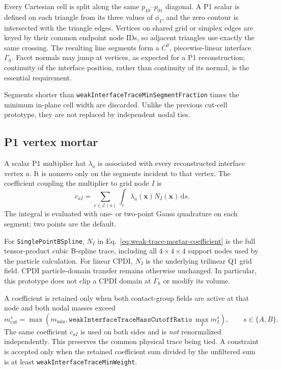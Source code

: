 Every Cartesian cell is split along the same $p_{10}$--$p_{01}$ diagonal.  A
P1 scalar is defined on each triangle from its three values of $\phi_I$, and
the zero contour is intersected with the triangle edges.  Vertices on shared
grid or simplex edges are keyed by their common endpoint node IDs, so adjacent
triangles use exactly the same crossing.  The resulting line segments form a
$C^0$, piecewise-linear interface $\Gamma_h$.  Facet normals may jump at
vertices, as expected for a P1 reconstruction; continuity of the interface
position, rather than continuity of its normal, is the essential requirement.

Segments shorter than
\texttt{weakInterfaceTraceMinSegmentFraction} times the minimum in-plane cell
width are discarded.  Unlike the previous cut-cell prototype, they are not
replaced by independent nodal ties.

\subsection{P1 vertex mortar}

A scalar P1 multiplier hat $\lambda_a$ is associated with every reconstructed
interface vertex $a$.  It is nonzero only on the segments incident to that
vertex.  The coefficient coupling the multiplier to grid node $I$ is
\begin{equation}
  c_{aI} =
  \sum_{e\in\mathcal{E}(a)}\int_e \lambda_a(\mathbf{x})N_I(\mathbf{x})\,\mathrm{d}s.
  \label{eq:weak-trace-mortar-coefficient}
\end{equation}
The integral is evaluated with one- or two-point Gauss quadrature on each
segment; two points are the default.

For \texttt{SinglePointBSpline}, $N_I$ in
Eq.~\eqref{eq:weak-trace-mortar-coefficient} is the full tensor-product cubic
B-spline trace, including all $4\times4\times4$ support nodes used by the
particle calculation.  For linear CPDI, $N_I$ is the underlying trilinear Q1
grid field.  CPDI particle-domain transfer remains otherwise unchanged.  In
particular, this prototype does not clip a CPDI domain at $\Gamma_h$ or modify
its volume.

A coefficient is retained only when both contact-group fields are active at
that node and both nodal masses exceed
\begin{equation}
  m_{\mathrm{cut}}^s =
  \max\!\left(m_{\min},
  \texttt{weakInterfaceTraceMassCutoffRatio}\,\max_I m_I^s\right),
  \qquad s\in\{A,B\}.
  \label{eq:weak-trace-mass-cutoff}
\end{equation}
The same coefficient $c_{aI}$ is used on both sides and is \emph{not}
renormalized independently.  This preserves the common physical trace being
tied.  A constraint is accepted only when the retained coefficient sum divided
by the unfiltered sum is at least
\texttt{weakInterfaceTraceMinWeight}.


